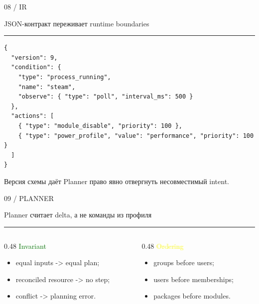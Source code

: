 \documentclass[aspectratio=169,10pt]{beamer}
\newcommand{\kicker}[1]{\textcolor{Muted}{\footnotesize\MakeUppercase{#1}}}
\newcommand{\slidehead}[2]{
  \vspace*{0.2cm}
  \kicker{#1}\par
  \vspace{0.1cm}
  {\usebeamerfont{frametitle}\textcolor{Text}{#2}}\par
  \vspace{0.18cm}
  {\color{Muted}\rule{\linewidth}{0.4pt}}
  \vspace{0.25cm}
}
\newcommand{\muted}[1]{\textcolor{Muted}{#1}}
\newcommand{\green}[1]{\textcolor{Green}{#1}}
\newcommand{\yellow}[1]{\textcolor{Yellow}{#1}}
\begin{document}
\begin{frame}[fragile]{}
  \slidehead{08 / IR}{JSON-контракт переживает runtime boundaries}

  \begin{verbatim}
{
  "version": 9,
  "condition": {
    "type": "process_running",
    "name": "steam",
    "observe": { "type": "poll", "interval_ms": 500 }
  },
  "actions": [
    { "type": "module_disable", "priority": 100 },
    { "type": "power_profile", "value": "performance", "priority": 100 }
  ]
}
  \end{verbatim}

  \vspace{0.15cm}
  \muted{Версия схемы даёт Planner право явно отвергнуть несовместимый intent.}
\end{frame}

\begin{frame}{}
  \slidehead{09 / planner}{Planner считает delta, а не команды из профиля}

  \centering

  \vspace{0.45cm}
  \begin{columns}[T,totalwidth=\textwidth]
    \begin{column}{0.48\textwidth}
      \green{Invariant}
      \begin{itemize}
        \item equal inputs -> equal plan;
        \item reconciled resource -> no step;
        \item conflict -> planning error.
      \end{itemize}
    \end{column}
    \begin{column}{0.48\textwidth}
      \yellow{Ordering}
      \begin{itemize}
        \item groups before users;
        \item users before memberships;
        \item packages before modules.
      \end{itemize}
    \end{column}
  \end{columns}
\end{frame}
\end{document}
